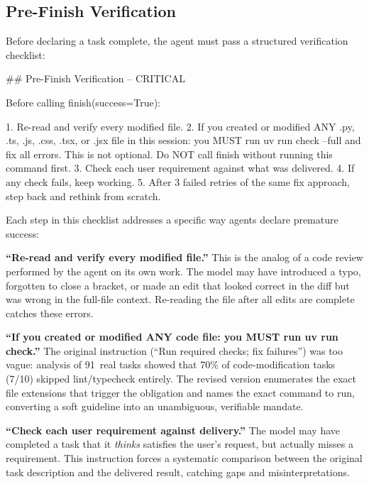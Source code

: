 \documentclass{article}
\begin{document}
\subsection{Pre-Finish Verification}

Before declaring a task complete, the agent must pass a structured verification checklist:

\begin{prompt}
## Pre-Finish Verification -- CRITICAL

Before calling finish(success=True):

1. Re-read and verify every modified file.
2. If you created or modified ANY .py, .ts, .js, .css,
   .tsx, or .jsx file in this session: you MUST run
   uv run check --full and fix all errors. This is not
   optional. Do NOT call finish without running this
   command first.
3. Check each user requirement against what was
   delivered.
4. If any check fails, keep working.
5. After 3 failed retries of the same fix approach,
   step back and rethink from scratch.
\end{prompt}

\noindent Each step in this checklist addresses a specific way agents declare premature success:

\textbf{``Re-read and verify every modified file.''}  This is the analog of a code review performed by the agent on its own work.  The model may have introduced a typo, forgotten to close a bracket, or made an edit that looked correct in the diff but was wrong in the full-file context.  Re-reading the file after all edits are complete catches these errors.

\textbf{``If you created or modified ANY code file: you MUST run uv run check.''}  The original instruction (``Run required checks; fix failures'') was too vague: analysis of 91~real tasks showed that 70\% of code-modification tasks (7/10) skipped lint/typecheck entirely.  The revised version enumerates the exact file extensions that trigger the obligation and names the exact command to run, converting a soft guideline into an unambiguous, verifiable mandate.

\textbf{``Check each user requirement against delivery.''}  The model may have completed a task that it \emph{thinks} satisfies the user's request, but actually misses a requirement.  This instruction forces a systematic comparison between the original task description and the delivered result, catching gaps and misinterpretations.
\end{document}

